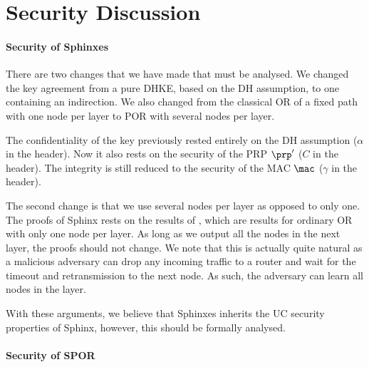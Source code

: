 \section{Security Discussion}%
\label{security-discussion}



\paragraph*{Security of Sphinxes}

There are two changes that we have made that must be analysed.
We changed the key agreement from a pure \ac{DHKE}, \ie based on the \ac{DH} 
assumption, to one containing an indirection.
We also changed from the classical \ac{OR} of a fixed path with one node per 
layer to \ac{POR} with several nodes per layer.

The confidentiality of the key previously rested entirely on the \ac{DH} 
assumption (\(\alpha\) in the header).
Now it also rests on the security of the \ac{PRP} \(\prp'\) (\(C\) in the 
header).
The integrity is still reduced to the security of the \ac{MAC} \(\mac\) 
(\(\gamma\) in the header).

The second change is that we use several nodes per layer as opposed to only 
one.
The proofs of Sphinx rests on the results of \textcite{CLOnionRouting}, which 
are results for ordinary \ac{OR} with only one node per layer.
As long as we output all the nodes in the next layer, the proofs should not 
change.
We note that this is actually quite natural as a malicious adversary can drop 
any incoming traffic to a router and wait for the timeout and retransmission to 
the next node.
As such, the adversary can learn all nodes in the layer.

With these arguments, we believe that Sphinxes inherits the \ac{UC} security 
properties of Sphinx, however, this should be formally analysed.

\paragraph*{Security of \acs*{SPOR}}

